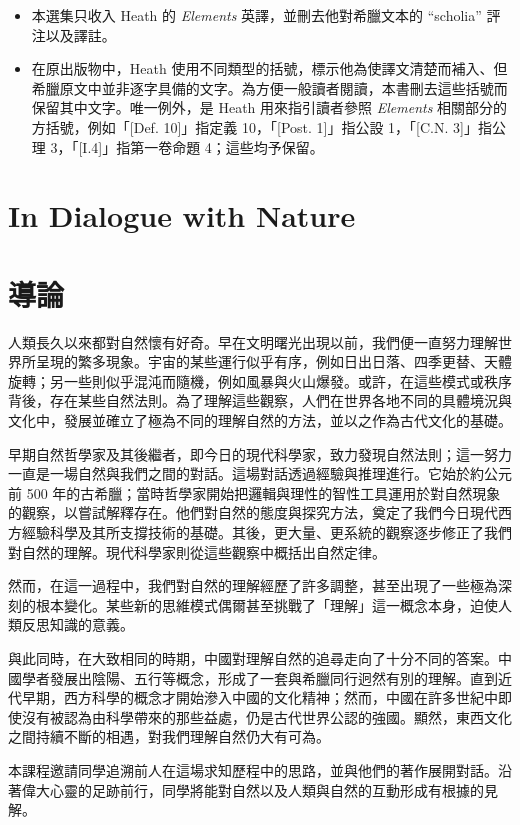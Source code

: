 \begin{itemize}
\item 本選集只收入 Heath 的 \textit{Elements} 英譯，並刪去他對希臘文本的 ``scholia'' 評注以及譯註。
\item 在原出版物中，Heath 使用不同類型的括號，標示他為使譯文清楚而補入、但希臘原文中並非逐字具備的文字。為方便一般讀者閱讀，本書刪去這些括號而保留其中文字。唯一例外，是 Heath 用來指引讀者參照 \textit{Elements} 相關部分的方括號，例如「[Def. 10]」指定義 10，「[Post. 1]」指公設 1，「[C.N. 3]」指公理 3，「[I.4]」指第一卷命題 4；這些均予保留。
\end{itemize}

\section*{In Dialogue with Nature}
\section*{導論}
\noindent 人類長久以來都對自然懷有好奇。早在文明曙光出現以前，我們便一直努力理解世界所呈現的繁多現象。宇宙的某些運行似乎有序，例如日出日落、四季更替、天體旋轉；另一些則似乎混沌而隨機，例如風暴與火山爆發。或許，在這些模式或秩序背後，存在某些自然法則。為了理解這些觀察，人們在世界各地不同的具體境況與文化中，發展並確立了極為不同的理解自然的方法，並以之作為古代文化的基礎。

\noindent 早期自然哲學家及其後繼者，即今日的現代科學家，致力發現自然法則；這一努力一直是一場自然與我們之間的對話。這場對話透過經驗與推理進行。它始於約公元前 500 年的古希臘；當時哲學家開始把邏輯與理性的智性工具運用於對自然現象的觀察，以嘗試解釋存在。他們對自然的態度與探究方法，奠定了我們今日現代西方經驗科學及其所支撐技術的基礎。其後，更大量、更系統的觀察逐步修正了我們對自然的理解。現代科學家則從這些觀察中概括出自然定律。

\noindent 然而，在這一過程中，我們對自然的理解經歷了許多調整，甚至出現了一些極為深刻的根本變化。某些新的思維模式偶爾甚至挑戰了「理解」這一概念本身，迫使人類反思知識的意義。

\noindent 與此同時，在大致相同的時期，中國對理解自然的追尋走向了十分不同的答案。中國學者發展出陰陽、五行等概念，形成了一套與希臘同行迥然有別的理解。直到近代早期，西方科學的概念才開始滲入中國的文化精神；然而，中國在許多世紀中即使沒有被認為由科學帶來的那些益處，仍是古代世界公認的強國。顯然，東西文化之間持續不斷的相遇，對我們理解自然仍大有可為。

\noindent 本課程邀請同學追溯前人在這場求知歷程中的思路，並與他們的著作展開對話。沿著偉大心靈的足跡前行，同學將能對自然以及人類與自然的互動形成有根據的見解。

